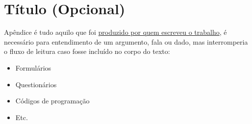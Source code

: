 \chapter{Título (Opcional)}
Apêndice é tudo aquilo que foi \underline{produzido por quem escreveu o trabalho}, é necessário para entendimento de um argumento, fala ou dado, mas interromperia o fluxo de leitura caso fosse incluído no corpo do texto:  

\begin{itemize}
    \item Formulários 
    \item Questionários 
    \item Códigos de programação 
    \item Etc.
\end{itemize}
